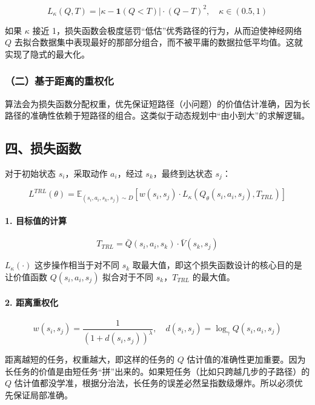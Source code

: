 \[
L_\kappa(Q,T)=|\kappa-\mathbf{1}(Q<T)|\cdot(Q-T)^{2},\quad \kappa\in(0.5,1)
\]

如果 \(\kappa\) 接近 1，损失函数会极度惩罚``低估''优秀路径的行为，从而迫使神经网络 \(Q\) 去拟合数据集中表现最好的那部分组合，而不被平庸的数据拉低平均值。这就实现了隐式的最大化。

\hypertarget{ux4e8cux57faux4e8eux8dddux79bbux7684ux91cdux6743ux5316}{%
\subsubsection{（二）基于距离的重权化}\label{ux4e8cux57faux4e8eux8dddux79bbux7684ux91cdux6743ux5316}}

算法会为损失函数分配权重，优先保证短路径（小问题）的价值估计准确，因为长路径的准确性依赖于短路径的组合。这类似于动态规划中``由小到大''的求解逻辑。

\hypertarget{ux56dbux635fux5931ux51fdux6570-2}{%
\subsection{四、损失函数}\label{ux56dbux635fux5931ux51fdux6570-2}}

对于初始状态 \(s_i\)，采取动作 \(a_i\)，经过 \(s_k\)，最终到达状态 \(s_j\)：

\[
L^{TRL}(\theta)=\mathbb{E}_{(s_i,a_i,s_k,s_j)\sim D}[w(s_i,s_j)\cdot L_\kappa(Q_\theta(s_i,a_i,s_j),T_{TRL})]
\]

\hypertarget{ux76eeux6807ux503cux7684ux8ba1ux7b97}{%
\paragraph{1. 目标值的计算}\label{ux76eeux6807ux503cux7684ux8ba1ux7b97}}

\[
T_{TRL}=\bar{Q}(s_i,a_i,s_k)\cdot \bar{V}(s_k,s_j)
\]

\(L_\kappa(\cdot)\) 这步操作相当于对不同 \(s_k\) 取最大值，即这个损失函数设计的核心目的是让价值函数 \(Q(s_i,a_i,s_j)\) 拟合对于不同 \(s_k\)，\(T_{TRL}\) 的最大值。

\hypertarget{ux8dddux79bbux91cdux6743ux5316}{%
\paragraph{2. 距离重权化}\label{ux8dddux79bbux91cdux6743ux5316}}

\[
w(s_i,s_j)=\frac{1}{(1+d(s_i,s_j))^{\lambda}},\quad d(s_i,s_j)=\log_\gamma Q(s_i,a_i,s_j)
\]

距离越短的任务，权重越大，即这样的任务的 \(Q\) 估计值的准确性更加重要。因为长任务的价值是由短任务``拼''出来的。如果短任务（比如只跨越几步的子路径）的 \(Q\) 估计值都没学准，根据分治法，长任务的误差必然呈指数级爆炸。所以必须优先保证局部准确。

